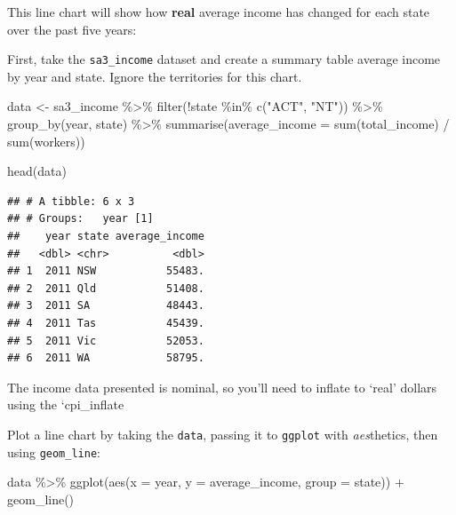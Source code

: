 \documentclass[
]{book}
\newenvironment{Shaded}{\begin{snugshade}}{\end{snugshade}}
\newcommand{\AttributeTok}[1]{\textcolor[rgb]{0.77,0.63,0.00}{#1}}
\newcommand{\FunctionTok}[1]{\textcolor[rgb]{0.00,0.00,0.00}{#1}}
\newcommand{\NormalTok}[1]{#1}
\newcommand{\OtherTok}[1]{\textcolor[rgb]{0.56,0.35,0.01}{#1}}
\newcommand{\SpecialCharTok}[1]{\textcolor[rgb]{0.00,0.00,0.00}{#1}}
\newcommand{\StringTok}[1]{\textcolor[rgb]{0.31,0.60,0.02}{#1}}
\begin{document}
This line chart will show how \textbf{real} average income has changed for each state over the past five years:

First, take the \texttt{sa3\_income} dataset and create a summary table average income by year and state. Ignore the territories for this chart.

\begin{Shaded}
\begin{Highlighting}[]
\NormalTok{data }\OtherTok{\textless{}{-}}\NormalTok{ sa3\_income }\SpecialCharTok{\%\textgreater{}\%} 
  \FunctionTok{filter}\NormalTok{(}\SpecialCharTok{!}\NormalTok{state }\SpecialCharTok{\%in\%} \FunctionTok{c}\NormalTok{(}\StringTok{"ACT"}\NormalTok{, }\StringTok{"NT"}\NormalTok{)) }\SpecialCharTok{\%\textgreater{}\%} 
  \FunctionTok{group\_by}\NormalTok{(year, state) }\SpecialCharTok{\%\textgreater{}\%} 
  \FunctionTok{summarise}\NormalTok{(}\AttributeTok{average\_income =} \FunctionTok{sum}\NormalTok{(total\_income) }\SpecialCharTok{/} \FunctionTok{sum}\NormalTok{(workers))}

\FunctionTok{head}\NormalTok{(data)}
\end{Highlighting}
\end{Shaded}

\begin{verbatim}
## # A tibble: 6 x 3
## # Groups:   year [1]
##    year state average_income
##   <dbl> <chr>          <dbl>
## 1  2011 NSW           55483.
## 2  2011 Qld           51408.
## 3  2011 SA            48443.
## 4  2011 Tas           45439.
## 5  2011 Vic           52053.
## 6  2011 WA            58795.
\end{verbatim}

The income data presented is nominal, so you'll need to inflate to `real' dollars using the `cpi\_inflate

Plot a line chart by taking the \texttt{data}, passing it to \texttt{ggplot} with \emph{aes}thetics, then using \texttt{geom\_line}:

\begin{Shaded}
\begin{Highlighting}[]
\NormalTok{data }\SpecialCharTok{\%\textgreater{}\%} 
  \FunctionTok{ggplot}\NormalTok{(}\FunctionTok{aes}\NormalTok{(}\AttributeTok{x =}\NormalTok{ year,}
             \AttributeTok{y =}\NormalTok{ average\_income,}
             \AttributeTok{group =}\NormalTok{ state)) }\SpecialCharTok{+} 
  \FunctionTok{geom\_line}\NormalTok{()}
\end{Highlighting}
\end{Shaded}
\end{document}
